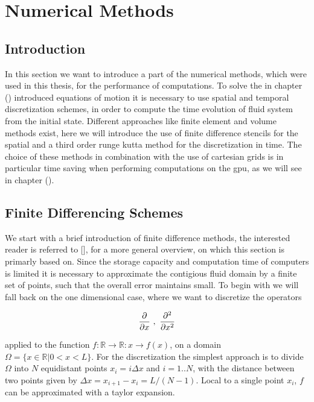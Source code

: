 \chapter{Numerical Methods}

\section{Introduction}

In this section we want to introduce a part of the numerical methods, which were used in this thesis, for the performance of computations.
To solve the in chapter () introduced equations of motion it is necessary to use spatial and temporal discretization schemes, in order to
compute the time evolution of fluid system from the initial state.
Different approaches like finite element and volume methods exist, here we will introduce the use of finite difference stencils for the
spatial and a third order runge kutta method for the discretization in time.
The choice of these methods in combination with the use of cartesian grids is in particular time saving when performing computations on the gpu, as we
will see in chapter ().

\section{Finite Differencing Schemes}

We start with a brief introduction of finite difference methods,
the interested reader is referred to [], for a more general overview, on which this section is primarly based on.
Since the storage capacity and computation time of computers is limited it is necessary to approximate the contigious fluid domain  by a finite set of points,
such that the overall error maintains small.
To begin with we will fall back on the one dimensional case, where we want to discretize the operators

\begin{align}
    \pdn[]{x} \ , \ \pdn[^2]{x^2}
\end{align}

applied to the function $f:\mathbb{R}\rightarrow \mathbb{R} : x  \rightarrow f(x)$, on a domain $\Omega = \{x \in \mathbb{R} | 0 < x < L\}$.
For the discretization the simplest approach is to divide $\Omega$ into $N$ equidistant points $x_i= i\Delta x$ and $i=1..N$,
with the distance between two points given by $\Delta x = x_{i+1} - x_i = L/(N-1)$.
Local to a single point $x_i$, $f$ can be approximated with a taylor expansion.

